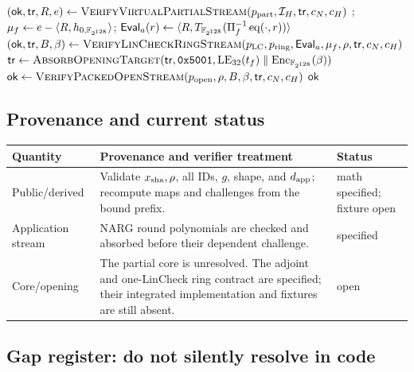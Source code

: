 \begin{algorithm}[H]
\begin{algorithmic}[1]
\State $(\mathsf{ok},\Tr,R,e)\gets
  \Call{VerifyVirtualPartialStream}{p_{\rm part},\mathcal I_H,\Tr,c_N,c_H}$
\State {};
  $\mu_f\gets e-\langle R,h_{0,\mathbb F_{2^{128}}}\rangle$;
  $\mathsf{Eval}_a(r)\gets\langle R,T_{\mathbb F_{2^{128}}}(\Pi_f^{-1}\operatorname{eq}(\cdot,r))\rangle$
\State $(\mathsf{ok},\Tr,B,\beta)\gets
  \Call{VerifyLinCheckRingStream}{p_{\rm LC},p_{\rm ring},\mathsf{Eval}_a,\mu_f,\rho,
    \Tr,c_N,c_H}$
\State {}
\State $\Tr\gets\Call{AbsorbOpeningTarget}{\Tr,\mathtt{0x5001},
  \operatorname{LE}_{32}(t_f)\parallel\operatorname{Enc}_{\K}(\beta)}$
\State $\mathsf{ok}\gets
  \Call{VerifyPackedOpenStream}{p_{\rm open},\rho,B,\beta,\Tr,c_N,c_H}$
\State {}
\State \Return $\mathsf{ok}$
\end{algorithmic}
\end{algorithm}

\subsection{Provenance and current status}

\begingroup\scriptsize
\setlength{\tabcolsep}{3pt}
\renewcommand{\arraystretch}{0.96}
\begin{tabularx}{\linewidth}{@{}p{0.78in}Xp{1.08in}@{}}
\toprule
\textbf{Quantity} & \textbf{Provenance and verifier treatment} &
\textbf{Status}\\
\midrule
Public/derived & Validate $x_{\rm sha},\rho$, all IDs, $g$, shape, and
$d_{\rm app}$; recompute maps and challenges from the bound prefix. &
math specified; fixture open\\
Application stream & NARG round polynomials are checked and absorbed before
their dependent challenge. & specified\\
Core/opening & The partial core is unresolved.  The adjoint and one-LinCheck
ring contract are specified; their integrated implementation and fixtures are
still absent. & open\\
\bottomrule
\end{tabularx}
\endgroup

\subsection{Gap register: do not silently resolve in code}


